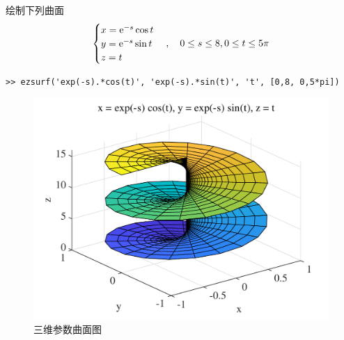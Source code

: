 \examples 绘制下列曲面
\begin{align*}
	\begin{cases}
		x = {\rm{e}}^{-s} \cos t\\
		y = {\rm{e}} ^{-s} \sin t\\
		z = t
	\end{cases}
, \quad 0 \le s \le 8,0\le t \le 5\pi
\end{align*}
\begin{lstlisting}
>> ezsurf('exp(-s).*cos(t)', 'exp(-s).*sin(t)', 't', [0,8, 0,5*pi])
\end{lstlisting}
\begin{figure}[!htb]
	\centering
	\includegraphics[width=0.8\linewidth]{pic/三维曲面.pdf}
	\caption{三维参数曲面图}
\end{figure}